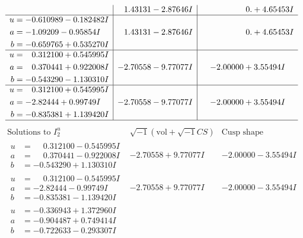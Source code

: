 \documentclass[1p]{elsarticle_modified}
\theoremstyle{definition}
\newcommand{\I}{\sqrt{-1}}
\begin{document}
$$\begin{array}{c|c|c}
 & \phantom{-}1.43131 - 2.87646 I & \phantom{-0.000000 -}0. + 4.65453 I \\ \hline\begin{aligned}
u &= -0.610989 - 0.182482 I \\
a &= -1.09209 - 0.95854 I \\
b &= -0.659765 + 0.535270 I\end{aligned}
 & \phantom{-}1.43131 - 2.87646 I & \phantom{-0.000000 -}0. + 4.65453 I \\ \hline\begin{aligned}
u &= \phantom{-}0.312100 + 0.545995 I \\
a &= \phantom{-}0.370441 + 0.922008 I \\
b &= -0.543290 - 1.130310 I\end{aligned}
 & -2.70558 - 9.77077 I & -2.00000 + 3.55494 I \\ \hline\begin{aligned}
u &= \phantom{-}0.312100 + 0.545995 I \\
a &= -2.82444 + 0.99749 I \\
b &= -0.835381 + 1.139420 I\end{aligned}
 & -2.70558 - 9.77077 I & -2.00000 + 3.55494 I\\
 \hline 
 \end{array}$$\newpage$$\begin{array}{c|c|c}  
\text{Solutions to }I^u_{2}& \I (\text{vol} + \sqrt{-1}CS) & \text{Cusp shape}\\
 \hline 
\begin{aligned}
u &= \phantom{-}0.312100 - 0.545995 I \\
a &= \phantom{-}0.370441 - 0.922008 I \\
b &= -0.543290 + 1.130310 I\end{aligned}
 & -2.70558 + 9.77077 I & -2.00000 - 3.55494 I \\ \hline\begin{aligned}
u &= \phantom{-}0.312100 - 0.545995 I \\
a &= -2.82444 - 0.99749 I \\
b &= -0.835381 - 1.139420 I\end{aligned}
 & -2.70558 + 9.77077 I & -2.00000 - 3.55494 I \\ \hline\begin{aligned}
u &= -0.336943 + 1.372960 I \\
a &= -0.904487 + 0.749414 I \\
b &= -0.722633 - 0.293307 I\end{aligned}

\end{array}$$
\end{document}
